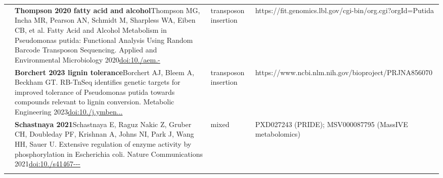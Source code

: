 \begin{landscape}
\begin{longtable}{@{}r@{\hspace{4pt}} L{86mm} L{74mm} L{78mm}@{}}
 & \textbf{Thompson 2020 fatty acid and alcohol}\newline Thompson MG, Incha MR, Pearson AN, Schmidt M, Sharpless WA, Eiben CB, et al. Fatty Acid and Alcohol Metabolism in Pseudomonas putida: Functional Analysis Using Random Barcode Transposon Sequencing. Applied and Environmental Microbiology 2020\newline \href{https://doi.org/10.1128/aem.01665-20}{doi:10./\allowbreak aem.-} & transposon insertion & https:/\allowbreak /\allowbreak fit.\allowbreak genomics.\allowbreak lbl.\allowbreak gov/\allowbreak cgi-\allowbreak bin/\allowbreak org.\allowbreak cgi?orgId=Putida \\
 & \textbf{Borchert 2023 lignin tolerance}\newline Borchert AJ, Bleem A, Beckham GT. RB-TnSeq identifies genetic targets for improved tolerance of Pseudomonas putida towards compounds relevant to lignin conversion. Metabolic Engineering 2023\newline \href{https://doi.org/10.1016/j.ymben.2023.04.007}{doi:10./\allowbreak j.\allowbreak ymben...} & transposon insertion & https:/\allowbreak /\allowbreak www.\allowbreak ncbi.\allowbreak nlm.\allowbreak nih.\allowbreak gov/\allowbreak bioproject/\allowbreak PRJNA856070 \\
 & \textbf{Schastnaya 2021}\newline Schastnaya E, Raguz Nakic Z, Gruber CH, Doubleday PF, Krishnan A, Johns NI, Park J, Wang HH, Sauer U. Extensive regulation of enzyme activity by phosphorylation in Escherichia coli. Nature Communications 2021\newline \href{https://doi.org/10.1038/s41467-021-25988-4}{doi:10./\allowbreak s41467---} & mixed & PXD027243 (PRIDE); MSV000087795 (MassIVE metabolomics) \\
\addlinespace[5pt]

\end{longtable}
\end{landscape}
